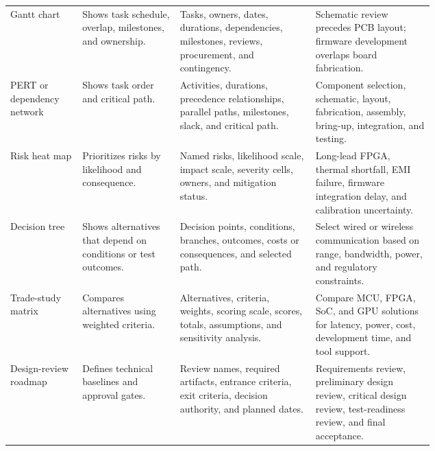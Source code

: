 \begin{singlespace}
\begin{longtable}{@{}L{0.17\linewidth} L{0.23\linewidth} L{0.32\linewidth} L{\tabcolsep\relax}@{}}
\addlinespace[3pt]
Gantt chart & Shows task schedule, overlap, milestones, and ownership. & Tasks, owners, dates, durations, dependencies, milestones, reviews, procurement, and contingency. & Schematic review precedes PCB layout; firmware development overlaps board fabrication. \\
\addlinespace[3pt]
PERT or dependency network & Shows task order and critical path. & Activities, durations, precedence relationships, parallel paths, milestones, slack, and critical path. & Component selection, schematic, layout, fabrication, assembly, bring-up, integration, and testing. \\
\addlinespace[3pt]
Risk heat map & Prioritizes risks by likelihood and consequence. & Named risks, likelihood scale, impact scale, severity cells, owners, and mitigation status. & Long-lead FPGA, thermal shortfall, EMI failure, firmware integration delay, and calibration uncertainty. \\
\addlinespace[3pt]
Decision tree & Shows alternatives that depend on conditions or test outcomes. & Decision points, conditions, branches, outcomes, costs or consequences, and selected path. & Select wired or wireless communication based on range, bandwidth, power, and regulatory constraints. \\
\addlinespace[3pt]
Trade-study matrix & Compares alternatives using weighted criteria. & Alternatives, criteria, weights, scoring scale, scores, totals, assumptions, and sensitivity analysis. & Compare MCU, FPGA, SoC, and GPU solutions for latency, power, cost, development time, and tool support. \\
\addlinespace[3pt]
Design-review roadmap & Defines technical baselines and approval gates. & Review names, required artifacts, entrance criteria, exit criteria, decision authority, and planned dates. & Requirements review, preliminary design review, critical design review, test-readiness review, and final acceptance. \\
\end{longtable}
\end{singlespace}



